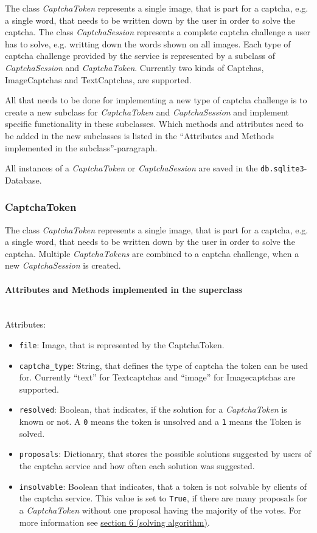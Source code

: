 The class \emph{CaptchaToken} represents a single image, that is part for a captcha, e.g. a single word, that needs to be written down by the user in order to solve the captcha. The class \emph{CaptchaSession} represents a complete captcha challenge a user has to solve, e.g. writting down the words shown on all images. Each type of captcha challenge provided by the service is represented by a subclass of \emph{CaptchaSession} and \emph{CaptchaToken}. Currently two kinds of Captchas, ImageCaptchas and TextCaptchas, are supported. 


All that needs to be done for implementing a new type of captcha challenge is to create a new subclass for \emph{CaptchaToken} and \emph{CaptchaSession} and implement specific functionality in these subclasses. Which methods and attributes need to be added in the new subclasses is listed in the ``Attributes and Methods implemented in the subclass''-paragraph.

All instances of a \emph{CaptchaToken} or \emph{CaptchaSession} are saved in the \verb|db.sqlite3|-Database. 

\subsubsection{CaptchaToken}

The class \emph{CaptchaToken} represents a single image, that is part for a captcha, e.g. a single word, that needs to be written down by the user in order to solve the captcha. Multiple \emph{CaptchaTokens} are combined to a captcha challenge, when a new \emph{CaptchaSession} is created.

\paragraph{Attributes and Methods implemented in the superclass} \mbox{} \\

Attributes:

\begin{itemize}
\item \verb|file|: Image, that is represented by the CaptchaToken.
\item \verb|captcha_type|: String, that defines the type of captcha the token can be used for. Currently ``text'' for Textcaptchas and ``image'' for Imagecaptchas are supported.
\item \verb|resolved|: Boolean, that indicates, if the solution for a \emph{CaptchaToken} is known or not. A \verb|0| means the token is unsolved and a \verb|1| means the Token is solved.
\item \verb|proposals|: Dictionary, that stores the possible solutions suggested by users of the captcha service and how often each solution was suggested.
\item \verb|insolvable|: Boolean that indicates, that a token is not solvable by clients of the captcha service. This value is set to \verb|True|, if there are many proposals for a \emph{CaptchaToken} without one proposal having the majority of the votes. For more information see \hyperref[sec:solving_algorithm]{section 6 (solving algorithm)}.
\end{itemize}

